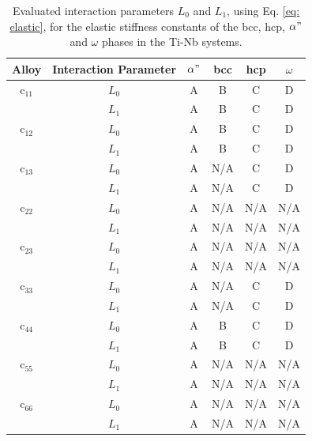 \newpage
\begin{table}[H]
	\caption{Evaluated interaction parameters $L_0$ and $L_1$, using Eq. \ref{eq: elastic}, for the elastic stiffness constants of the bcc, hcp, $\alpha"$ and $\omega$ phases in the Ti-Nb systems.}
	\centering
	\begin{tabular}{ c c c c c c }
		\hline
		Alloy & Interaction Parameter & $\alpha"$ & bcc & hcp & $\omega$\\
		\hline
		c$_{11}$ & $L_{0}$ & A & B & C & D \\
		& $L_{1}$ & A & B & C & D \\
		c$_{12}$ & $L_{0}$ & A & B & C & D \\
		& $L_{1}$ & A & B & C & D \\
		c$_{13}$ & $L_{0}$ & A & N/A & C & D \\
		& $L_{1}$ & A & N/A & C & D \\
		c$_{22}$ & $L_{0}$ & A & N/A & N/A & N/A \\
		& $L_{1}$ & A & N/A & N/A & N/A \\
		c$_{23}$ & $L_{0}$ & A & N/A & N/A & N/A \\
		& $L_{1}$ & A & N/A & N/A & N/A \\
		c$_{33}$ & $L_{0}$ & A & N/A & C & D \\
		& $L_{1}$ & A & N/A & C & D \\
		c$_{44}$ & $L_{0}$ & A & B & C & D \\
		& $L_{1}$ & A & B & C & D \\
		c$_{55}$ & $L_{0}$ & A & N/A & N/A & N/A \\
		& $L_{1}$ & A & N/A & N/A & N/A \\
		c$_{66}$ & $L_{0}$ & A & N/A & N/A & N/A \\
		& $L_{1}$ & A & N/A & N/A & N/A \\
		\hline
	\end{tabular}
	\label{Ch7-table:intpara}
\end{table}
\clearpage



